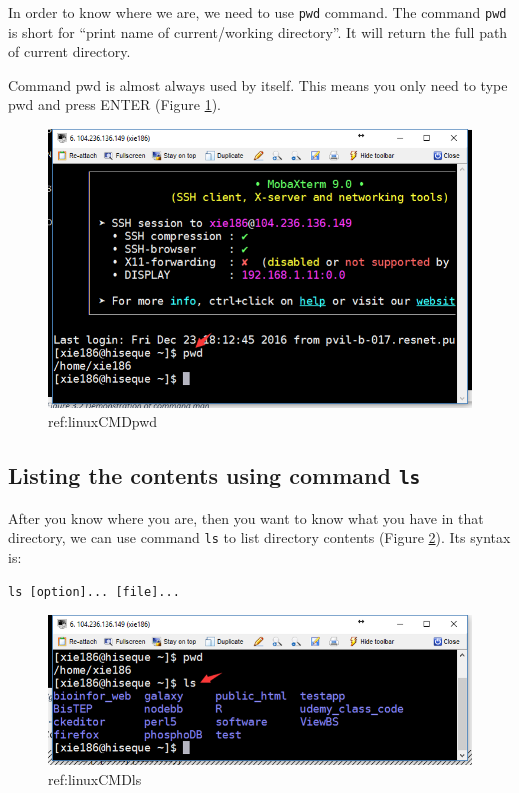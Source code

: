 \documentclass[]{book}
\begin{document}
In order to know where we are, we need to use \texttt{pwd} command. The command \texttt{pwd} is short for ``print name of current/working directory''. It will return the full path of current directory.

Command pwd is almost always used by itself. This means you only need to type pwd and press ENTER (Figure \ref{fig:linuxCMDpwd}).



\begin{figure}

{\centering \includegraphics[width=0.8\linewidth]{figures/linuxCMDpwd} 

}

\caption{ref:linuxCMDpwd}\label{fig:linuxCMDpwd}
\end{figure}

\hypertarget{listing-the-contents-using-command-ls}{%
\subsection{\texorpdfstring{Listing the contents using command \texttt{ls}}{Listing the contents using command ls}}\label{listing-the-contents-using-command-ls}}

After you know where you are, then you want to know what you have in that
directory, we can use command \texttt{ls} to list directory contents (Figure \ref{fig:linuxCMDls}). Its syntax is:

\begin{verbatim}
ls [option]... [file]...
\end{verbatim}



\begin{figure}

{\centering \includegraphics[width=0.8\linewidth]{figures/linuxCMDls} 

}

\caption{ref:linuxCMDls}\label{fig:linuxCMDls}
\end{figure}
\end{document}
